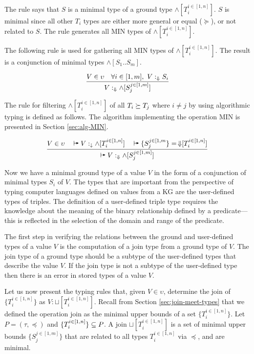 \documentclass[runningheads]{llncs}
\newcommand{\darr}{\downarrow}
\newcommand{\Darr}{\Downarrow}
\newcommand{\vdasharr}{%
    \mathrel{%
        \vdash\hspace*{-5pt}%
        \raisebox{2.3pt}{\scalebox{.5}{\(\blacktriangleright\)}}%
    }%
}\newcommand{\D}{{\Delta}}
\begin{document}
The rule says that $S$ is a minimal type of a ground type
$\land[T_i^{i\in[1,n]}]$. $S$ is minimal since all other $T_i$ types are
either more general or equal ($\succeq$), or not related to $S$. The
rule generates all MIN types of $\land[T_i^{i\in[1,n]}]$.

The following rule is used for gathering all MIN types of
$\land[T_i^{i\in[1,n]}]$. The result is a conjunction of minimal types
$\land[S_1..S_m]$.

\begin{equation}
\label{rul:min-gather}
\dfrac{V\in\upsilon\quad\forall\/i\in[1,m],\ V:_\Darr\/S_i}
      {V:_{\Darr}\land[S_j^{j\in[1,m]}]}
\end{equation}


The rule for filtering $\land[T_i^{i\in[1,n]}]$ of all
$T_i\succeq\/T_j$ where $i\not=j$ by using algorithmic typing is
defined as follows. The algorithm implementing the operation MIN is
presented in Section \ref{sec:alg-MIN}.

\begin{equation}
\label{rul:alg-min}
\dfrac{V\in\upsilon\quad\vdasharr\/V:_\darr\land[T_i^{i\in[1,n]}]\quad\vdasharr\/\{S_j^{j\in[1,m}\}=\,\Darr\kern -3pt[T_i^{i\in[1,n]}]}
{\vdasharr\/V:_{\Darr}\land\/[S_j^{j\in[1,m]}]}
\end{equation}

Now we have a minimal ground type of a value $V$ in the form of a
conjunction of minimal types $S_i$ of $V$. The types that are
important from the perspective of typing computer languages defined on
values from a KG are the user-defined types of triples. The definition
of a user-defined triple type requires the knowledge about the meaning
of the binary relationship defined by a predicate---this is reflected
in the selection of the domain and range of the predicate.

The first step in verifying the relations between the ground and
user-defined types of a value $V$ is the computation of a join type
from a ground type of $V$. The join type of a ground type should be a
subtype of the user-defined types that describe the value $V$. If the
join type is not a subtype of the user-defined type then there is an
error in stored types of a value $V$.

Let us now present the typing rules that, given $V\in\upsilon$,
determine the join of $\{T_i^{i\in[1,n]}\}$ as
$V:\sqcup[T_i^{i\in[1,n]}]$. Recall from Section
\ref{sec:join-meet-types} that we defined the operation join as the
minimal upper bounds of a set $\{T_i^{i\in[1,n]}\}$. Let
$P=(\tau,\preceq)$ and $\{T_i^{i\in[1,n]}\}\subseteq\/P$. A join
$\sqcup[T_i^{i\in[1,n]}]$ is a set of minimal upper bounds
$\{S_j^{j\in[1,m]}\}$ that are related to all types $T_i^{i\in[1,n]}$
via $\preceq$, and are minimal.
\end{document}
